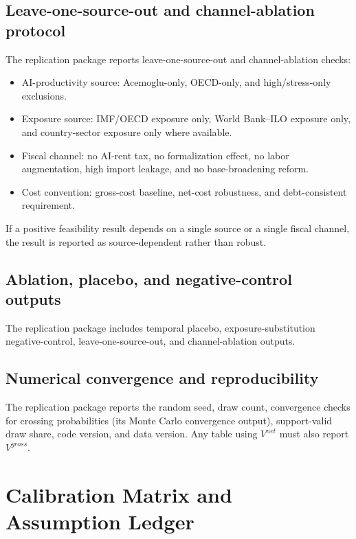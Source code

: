 \documentclass[11pt,a4paper]{article}
\begin{document}
\subsection{Leave-one-source-out and channel-ablation protocol}

The replication package reports leave-one-source-out and channel-ablation checks:
\begin{itemize}
    \item AI-productivity source: Acemoglu-only, OECD-only, and high/stress-only exclusions.
    \item Exposure source: IMF/OECD exposure only, World Bank--ILO exposure only, and country-sector exposure only where available.
    \item Fiscal channel: no AI-rent tax, no formalization effect, no labor augmentation, high import leakage, and no base-broadening reform.
    \item Cost convention: gross-cost baseline, net-cost robustness, and debt-consistent requirement.
\end{itemize}
If a positive feasibility result depends on a single source or a single fiscal channel, the result is reported as source-dependent rather than robust.



\subsection{Ablation, placebo, and negative-control outputs}

The replication package includes temporal placebo, exposure-substitution negative-control, leave-one-source-out, and channel-ablation outputs.

\subsection{Numerical convergence and reproducibility}

The replication package reports the random seed, draw count, convergence checks for crossing probabilities (its Monte Carlo convergence output), support-valid draw share, code version, and data version. Any table using $V^{net}$ must also report $V^{gross}$.

\section{Calibration Matrix and Assumption Ledger}\label{app:calibration_ledger}
\end{document}

